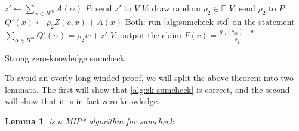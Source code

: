 \documentclass[english,12pt]{reedthesis}
\theoremstyle{plain}
\newtheorem{lemma}[lemma]{Lemma}
\theoremstyle{definition}
\theoremstyle{remark}
\begin{document}
\begin{algorithm}[htbp]
  $z' \leftarrow \sum_{\alpha \in H^{m}}A(\alpha)$\;
  $P$: send $z'$ to $V$\;
  $V$: draw random $\rho_{2} \in \mathbb{F}$\;
  $V$: send $\rho_{2}$ to $P$\;
  $Q'(x) \leftarrow \rho_{2}Z(c, x) + A(x)$\;
  Both: run \cref{alg:sumcheck-std} on the statement
  $\sum_{\alpha \in H^{m}}Q'(\alpha) = \rho_{2}w + z'$\;
  $V$: output the claim $F(c) = \frac{g_{m}(c_{m}) - w}{\rho_{1}}$\;
  \caption{Strong zero-knowledge sumcheck~\cite[Construction 3]{CFGS22}}\label{alg:zk-sumcheck}
\end{algorithm}

To avoid an overly long-winded proof, we will split the above theorem into two
lemmata. The first will show that \cref{alg:zk-sumcheck} is correct, and the
second will show that it is in fact zero-knowledge.

\begin{lemma}\label{lem:sumcheck-is-correct}
   is a MIP* algorithm for sumcheck.
\end{lemma}
\end{document}
